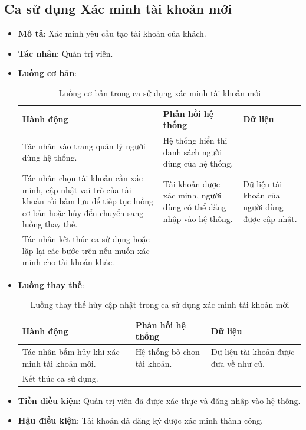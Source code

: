 \documentclass[./../main.tex]{subfiles}
\begin{document}
\subsection{Ca sử dụng Xác minh tài khoản mới}
\begin{itemize}
    \item \textbf{Mô tả}: Xác minh yêu cầu tạo tài khoản của khách.
    \item \textbf{Tác nhân}: Quản trị viên.
    \item \textbf{Luồng cơ bản}:
    \begin{table}[H]
    \caption{\label{uc-51}Luồng cơ bản trong ca sử dụng xác minh tài khoản mới}
    \begin{tabularx}{\textwidth}{| X | X | X |}
        \hline
        \textbf{Hành động} & \textbf{Phản hồi hệ thống} & \textbf{Dữ liệu} 
        \\ \hline
         Tác nhân vào trang quản lý người dùng hệ thống. & Hệ thống hiển thị danh sách người dùng của hệ thống. & 
        \\ \hline
        Tác nhân chọn tài khoản cần xác minh, cập nhật vai trò của tài khoản rồi bấm lưu để tiếp tục luồng cơ bản hoặc hủy đển chuyển sang luồng thay thế. & Tài khoản được xác minh, người dùng có thể đăng nhập vào hệ thống. & Dữ liệu tài khoản của người dùng được cập nhật.
        \\ \hline
        Tác nhân kết thúc ca sử dụng hoặc lặp lại các bước trên nếu muốn xác minh cho tài khoản khác. & &
        \\ \hline
    \end{tabularx}
    \end{table}    
    \item \textbf{Luồng thay thế}: 
        \begin{table}[H]
        \caption{\label{uc-52}Luồng thay thế hủy cập nhật trong ca sử dụng xác minh tài khoản mới}
        \begin{tabularx}{\textwidth}{| X | X | X |}
            \hline
            \textbf{Hành động} & \textbf{Phản hồi hệ thống} & \textbf{Dữ liệu} \\ \hline
            Tác nhân bấm hủy khi xác minh tài khoản mới. & Hệ thống bỏ chọn tài khoản. & Dữ liệu tài khoản được đưa về như cũ.
            \\ \hline
            Kết thúc ca sử dụng. & &
            \\ \hline
        \end{tabularx}
        \end{table}
    \item \textbf{Tiền điều kiện}: Quản trị viên đã được xác thực và đăng nhập vào hệ thống.
    \item \textbf{Hậu điều kiện}: Tài khoản đã đăng ký được xác minh thành công.
\end{itemize}
\end{document}
